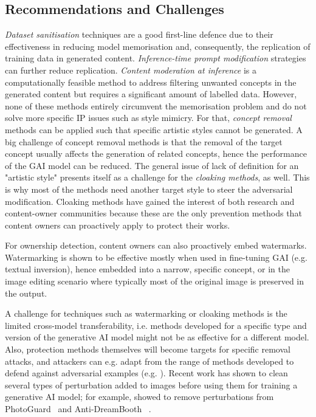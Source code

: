 \documentclass[conference,table]{IEEEtran}
\begin{document}
\subsection{Recommendations and Challenges}\label{sec:conclusion:challenges}

\textit{Dataset sanitisation} techniques are a good first-line defence due to their effectiveness in reducing model memorisation and, consequently, the replication of training data in generated content. 
\textit{Inference-time prompt modification} strategies can further reduce replication. 
\textit{Content moderation at inference} is a computationally feasible method to address filtering unwanted concepts in the generated content but requires a significant amount of labelled data.
However, none of these methods entirely circumvent the memorisation problem and do not solve more specific IP issues such as style mimicry.
For that, \textit{concept removal} methods can be applied such that specific artistic styles cannot be generated.
A big challenge of concept removal methods is that the removal of the target concept usually affects the generation of related concepts, hence the performance of the GAI model can be reduced.
The general issue of lack of definition for an "artistic style" presents itself as a challenge for the \textit{cloaking methods}, as well. 
This is why most of the methods need another target style to steer the adversarial modification. 
Cloaking methods have gained the interest of both research and content-owner communities because these are the only prevention methods that content owners can proactively apply to protect their works. 

For ownership detection, content owners can also proactively embed watermarks. 
Watermarking is shown to be effective mostly when used in fine-tuning GAI (e.g. textual inversion), hence embedded into a narrow, specific concept, or in the image editing scenario where typically most of the original image is preserved in the output. 

A challenge for techniques such as watermarking or cloaking methods is the limited cross-model transferability, i.e. methods developed for a specific type and version of the generative AI model might not be as effective for a different model. Also, protection methods themselves will become targets for specific removal attacks, and attackers can e.g. adapt from the range of methods developed to defend against adversarial examples (e.g. \cite{meng_magnet_2017}). Recent work has shown to clean several types of perturbation added to images before using them for training a generative AI model; for example, \cite{qin_destruction-restoration_2023} showed to remove perturbations from PhotoGuard~\cite{salman_raising_2023} and Anti-DreamBooth~\cite{van_le_anti-dreambooth_2023} .
\end{document}
